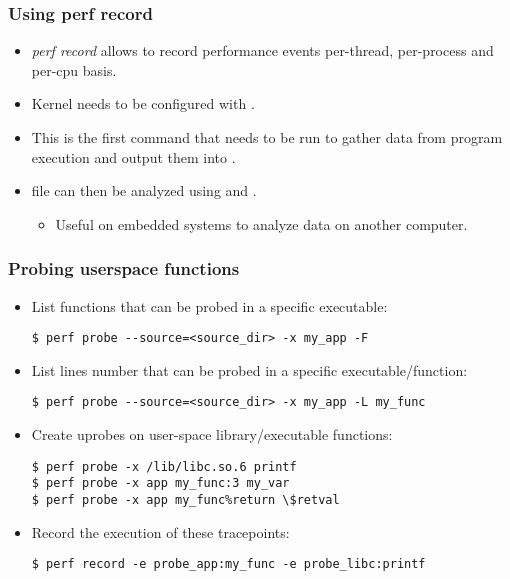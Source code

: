 \begin{frame}[fragile]
  \frametitle{Using perf record}
  \begin{itemize}
    \item {\em perf record} allows to record performance events per-thread,
          per-process and per-cpu basis.
    \item Kernel needs to be configured with .
    \item This is the first command that needs to be run to gather data from
          program execution and output them into .
    \item {} file can then be analyzed using 
          and .
    \begin{itemize}
      \item Useful on embedded systems to analyze data on another computer.
    \end{itemize}
  \end{itemize}
\end{frame}

\begin{frame}[fragile]
  \frametitle{Probing userspace functions}
  \begin{itemize}
    \item List functions that can be probed in a specific
          executable:
  \begin{block}{}
    \begin{verbatim}
$ perf probe --source=<source_dir> -x my_app -F
    \end{verbatim}
  \end{block}
    \item List lines number that can be probed in a specific
          executable/function:
  \begin{block}{}
    \begin{verbatim}
$ perf probe --source=<source_dir> -x my_app -L my_func
    \end{verbatim}
  \end{block}
    \item Create uprobes on user-space library/executable functions:
  \begin{block}{}
    \begin{verbatim}
$ perf probe -x /lib/libc.so.6 printf
$ perf probe -x app my_func:3 my_var
$ perf probe -x app my_func%return \$retval
    \end{verbatim}
  \end{block}
  \item Record the execution of these tracepoints:
  \begin{block}{}
    \begin{verbatim}
$ perf record -e probe_app:my_func -e probe_libc:printf
    \end{verbatim}
  \end{block}
  \end{itemize}
\end{frame}

